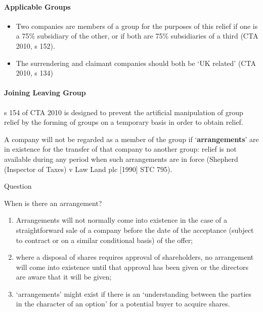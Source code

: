\documentclass[
]{article}
\providecommand{\tightlist}{%
  \setlength{\itemsep}{0pt}\setlength{\parskip}{0pt}}
\newenvironment{env-cd9ec69d-b412-4d96-9cef-e157a91791ae}
{
    \savenotes\tcolorbox[blanker,breakable,left=5pt,borderline west={2pt}{-4pt}{gray}]
}
{
    \endtcolorbox\spewnotes
}
\begin{document}
\hypertarget{applicable-groups}{%
\paragraph{Applicable Groups}\label{applicable-groups}}

\begin{itemize}
\tightlist
\item
  Two companies are members of a group for the purposes of this relief
  if one is a 75\% subsidiary of the other, or if both are 75\%
  subsidiaries of a third (CTA 2010, s 152).
\item
  The surrendering and claimant companies should both be `UK related'
  (CTA 2010, s 134)
\end{itemize}

\hypertarget{joining-leaving-group}{%
\paragraph{Joining Leaving Group}\label{joining-leaving-group}}

s 154 of CTA 2010 is designed to prevent the artificial manipulation of
group relief by the forming of groups on a temporary basis in order to
obtain relief.

A company will not be regarded as a member of the group if
`\textbf{arrangements}' are in existence for the transfer of that
company to another group: relief is not available during any period when
such arrangements are in force (Shepherd (Inspector of Taxes) v Law Land
plc {[}1990{]} STC 795).

\begin{env-cd9ec69d-b412-4d96-9cef-e157a91791ae}

Question

When is there an arrangement?

\end{env-cd9ec69d-b412-4d96-9cef-e157a91791ae}

\begin{enumerate}
\tightlist
\item
  Arrangements will not normally come into existence in the case of a
  straightforward sale of a company before the date of the acceptance
  (subject to contract or on a similar conditional basis) of the offer;
\item
  where a disposal of shares requires approval of shareholders, no
  arrangement will come into existence until that approval has been
  given or the directors are aware that it will be given;
\item
  `arrangements' might exist if there is an `understanding between the
  parties in the character of an option' for a potential buyer to
  acquire shares.
\end{enumerate}
\end{document}
